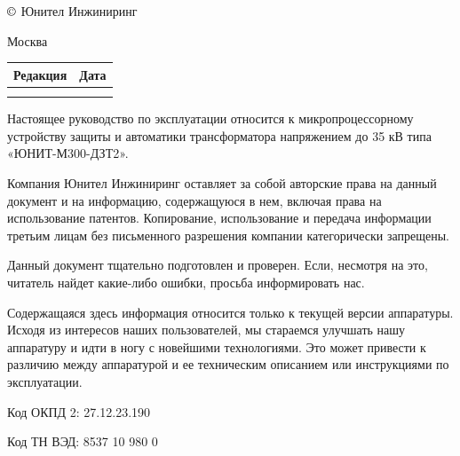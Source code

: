 \pagestyle{fancy}
\fancyhf{}
\renewcommand{\headrulewidth}{1pt}
\rhead{\colondevicetype}
\lhead{\color{black}{ЮТКБ.656122.609 РЭ6 Редакция \rev~от~\revdate}}
\rfoot{{\thepage}}
\renewcommand{\footrulewidth}{1pt}


\pagecolor{white}

\begin{flushleft}
\noindent
$\copyright$
\the\year{}
Юнител Инжиниринг

\vskip 3mm
Москва
\vskip 8mm

\setlength{\extrarowheight}{0.4cm} %
\begin{longtable}[l]{|>{\centering}m{4cm}|>{\centering\arraybackslash}m{4cm}|}%
    \hline
	Редакция & Дата \\
    \hline
	\textcolor{unigray}{\rev} & \textcolor{unigray}{\revdate} \\
    \hline  
    &  \\
    \hline 
                        
\end{longtable}

\vskip 70mm
\noindent
Настоящее руководство по эксплуатации относится к микропроцессорному устройству защиты и автоматики трансформатора напряжением до 35 кВ типа «ЮНИТ-М300-ДЗТ2».

\vskip 10mm
Компания Юнител Инжиниринг оставляет за собой авторские права на данный документ и на информацию, содержащуюся в нем, включая права на использование патентов. Копирование, использование и передача информации третьим лицам без письменного разрешения компании категорически запрещены.

\vskip 10mm
Данный документ тщательно подготовлен и проверен. Если, несмотря на это, читатель найдет какие-либо ошибки, просьба информировать нас.

\vskip 10mm
Содержащаяся здесь информация относится только к текущей версии аппаратуры. Исходя из интересов наших пользователей, мы стараемся улучшать нашу аппаратуру и идти в ногу с новейшими технологиями. Это может привести к различию между аппаратурой и ее техническим описанием или инструкциями по эксплуатации.

\vskip 10mm
Код ОКПД 2: 27.12.23.190 %

\vskip 5mm
Код ТН ВЭД: 8537 10 980 0 %

\end{flushleft}